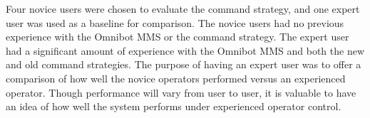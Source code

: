 \documentclass[onecolumn,10pt,final]{asme2ej}
\begin{document}
Four novice users were chosen to evaluate the command strategy, and one expert user was used as a baseline for comparison. The novice users had no previous experience with the Omnibot MMS or the command strategy. The expert user had a significant amount of experience with the Omnibot MMS and both the new and old command strategies. The purpose of having an expert user was to offer a comparison of how well the novice operators performed versus an experienced operator. Though performance will vary from user to user, it is valuable to have an idea of how well the system performs under experienced operator control.\\
\begin{table}[htbp!]
\caption{Averaged Timing Results from Preliminary Testing}
\noindent{}
\label{tab:results}
\end{table}
\end{document}
